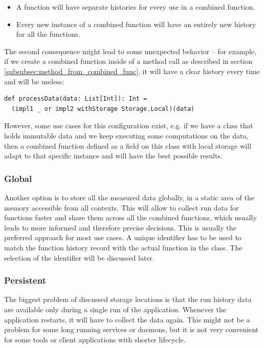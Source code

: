 \begin{itemize}
	\item A function will have separate histories for every use in a combined function.
	\item Every new instance of a combined function will have an entirely new history for all the functions.
\end{itemize}

The second consequence might lead to some unexpected behavior -- for example, if we create a combined function inside of a method call as described in section \ref{subsubsec:method_from_combined_func}, it will have a clear history every time and will be useless:

\lstset{style=Scala}
\begin{lstlisting}
def processData(data: List[Int]): Int = 
  (impl1 _ or impl2 withStorage Storage.Local)(data)
\end{lstlisting}

However, some use cases for this configuration exist, e.g. if we have a class that holds immutable data and we keep executing some computations on the data, then a combined function defined as a field on this class with local storage will adapt to that specific instance and will have the best possible results.

\subsubsection{Global}

Another option is to store all the measured data globally, in a static area of the memory accessible from all contexts. This will allow to collect run data for functions faster and share them across all the combined functions, which usually leads to more informed and therefore precise decisions. This is usually the preferred approach for most use cases. A unique identifier has to be used to match the function history record with the actual function in the  class. The selection of the identifier will be discussed later.

\subsubsection{Persistent}

The biggest problem of discussed storage locations is that the run history data are available only during a single run of the application. Whenever the application restarts, it will have to collect the data again. This might not be a problem for some long running services or daemons, but it is not very convenient for some tools or client applications with shorter lifecycle.

